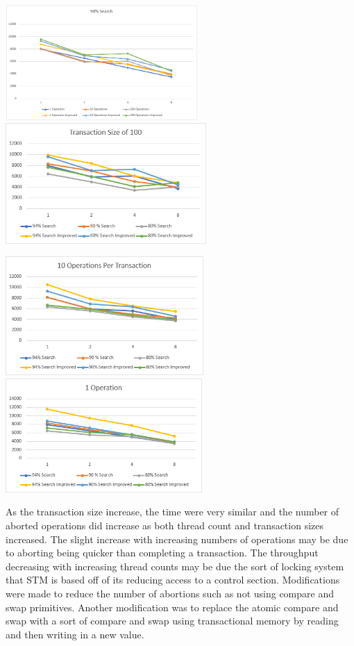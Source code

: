 \documentclass{article}
\begin{document}
 \includegraphics[width=2.8854in,height=1.7161in]{Report-img017.png} 
\includegraphics[width=3.0102in,height=1.8063in]{Report-img018.png} 


\bigskip


\bigskip

 \includegraphics[width=2.9689in,height=1.7811in]{Report-img019.png} 
\includegraphics[width=2.9492in,height=1.7083in]{Report-img020.png} 


\bigskip


\bigskip

As the transaction size increase, the time were very similar and the number of aborted operations did increase as both
thread count and transaction sizes increased. The slight increase with increasing numbers of operations may be due to
aborting being quicker than completing a transaction. The throughput decreasing with increasing thread counts may be
due the sort of locking system that STM is based off of its reducing access to a control section. Modifications were
made to reduce the number of abortions such as not using compare and swap primitives. Another modification was to
replace the atomic compare and swap with a sort of compare and swap using transactional memory by reading and then
writing in a new value.
\end{document}
